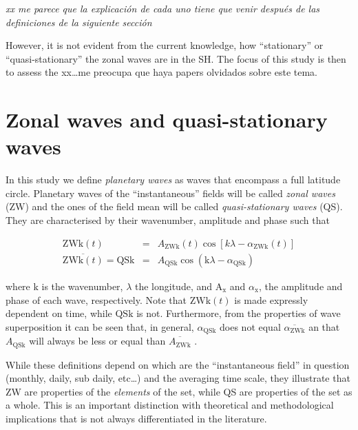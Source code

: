 \documentclass[draft,linenumbers]{agujournal2018}
\begin{document}
\emph{xx me parece que la explicación de cada uno tiene que venir
después de las definiciones de la siguiente sección}

However, it is not evident from the current knowledge, how
``stationary'' or ``quasi-stationary'' the zonal waves are in the SH.
The focus of this study is then to assess the xx\ldots{}me preocupa que
haya papers olvidados sobre este tema.

\section{Zonal waves and quasi-stationary waves}

In this study we define \emph{planetary waves} as waves that encompass a
full latitude circle. Planetary waves of the ``instantaneous'' fields
will be called \emph{zonal waves} (ZW) and the ones of the field mean
will be called \emph{quasi-stationary waves} (QS). They are
characterised by their wavenumber, amplitude and phase such that

\begin{linenomath*}
\begin{eqnarray}\label{eq:ZW}
\mathrm{ZWk}(t) & = & A_\mathrm{ZWk}(t)\cos \left [ k\lambda - \alpha_\mathrm{ZWk}(t) \right ] \\ 
\overline{\mathrm{ZWk}(t)} = \mathrm{QSk} & = & A_\mathrm{QSk}\cos \left (  \mathrm{k}\lambda - \alpha_\mathrm{QSk} \right ) \label{eq:QS}
\end{eqnarray}
\end{linenomath*}

where \(\mathrm{k}\) is the wavenumber, \(\lambda\) the longitude, and
\(\mathrm{A_{x}}\) and \(\alpha_\mathrm{x}\), the amplitude and phase of
each wave, respectively. Note that \(\mathrm{ZWk}(t)\) is made expressly
dependent on time, while \(\mathrm{QSk}\) is not. Furthermore, from the
properties of wave superposition it can be seen that, in general,
\(\alpha_\mathrm{QSk}\) does not equal
\(\overline{\alpha_\mathrm{ZWk}}\) an that \(A_\mathrm{QSk}\) will
always be less or equal than \(\overline{A_\mathrm{ZWk}}\)
\citep{Pain2005}.

While these definitions depend on which are the ``instantaneous field''
in question (monthly, daily, sub daily, etc\ldots{}) and the averaging
time scale, they illustrate that ZW are properties of the
\emph{elements} of the set, while QS are properties of the set as a
whole. This is an important distinction with theoretical and
methodological implications that is not always differentiated in the
literature.
\end{document}
